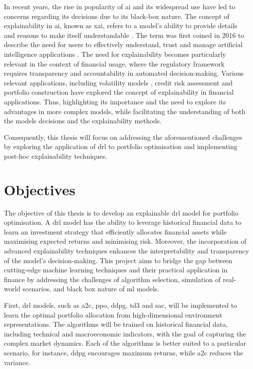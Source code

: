 In recent years, the rise in popularity of \acrfull{ai} and its widespread use have led to concerns regarding its decisions due to its black-box nature. The concept of explainability in \acrshort{ai}, known as \acrfull{xai}, refers to a model's ability to provide details and reasons to make itself understandable \cite{BarredoArrieta2019}. The term was first coined in 2016 to describe the need for users to effectively understand, trust and manage artificial intelligence applications \cite{Gunning2019}. The need for explainability becomes particularly relevant in the context of financial usage, where the regulatory framework requires transparency and accountability in automated decision-making. Various relevant applications, including volatility models \cite{Brigo2021}, credit risk assessment \cite{GarciaCespedes2025} and portfolio construction \cite{Cortes2024} have explored the concept of explainability in financial applications. Thus, highlighting its importance and the need to explore its advantages in more complex models, while facilitating the understanding of both the models decisions and the explainability methods.

Consequently, this thesis will focus on addressing the aforementioned challenges by exploring the application of \acrfull{drl} to portfolio optimisation and implementing post-hoc explainability techniques. 

\section{Objectives} \label{sec:introduction-objectives}

The objective of this thesis is to develop an explainable \acrlong{drl} model for portfolio optimisation. A \acrshort{drl} model has the ability to leverage historical financial data to learn an investment strategy that efficiently allocates financial assets while maximising expected returns and minimising risk. Moreover, the incorporation of advanced explainability techniques enhances the interpretability and transparency of the model's decision-making. This project aims to bridge the gap between cutting-edge machine learning techniques and their practical application in finance by addressing the challenges of algorithm selection, simulation of real-world scenarios, and black box nature of \acrshort{ml} models.

First, \acrshort{drl} models, such as \acrfull{a2c}, \acrfull{ppo}, \acrfull{ddpg}, \acrfull{td3} and \acrfull{sac}, will be implemented to learn the optimal portfolio allocation from high-dimensional environment representations. The algorithms will be trained on historical financial data, including technical and macroeconomic indicators, with the goal of capturing the complex market dynamics. Each of the algorithms is better suited to a particular scenario, for instance, \acrshort{ddpg} encourages maximum returns, while \acrshort{a2c} reduces the variance.

